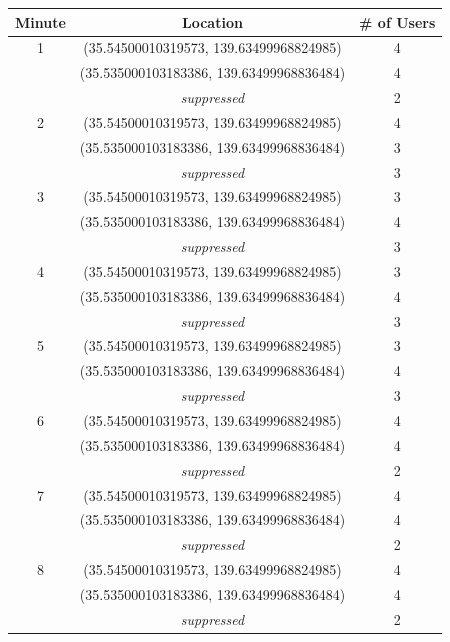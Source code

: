 \begin{table}[htbp]
    \centering
    \begin{tabular}{|c|c|c|} 
        \hline
        \textbf{Minute} & \textbf{Location} & \textbf{\# of Users}\\ [0.5ex] 
        \hline
        1 & (35.54500010319573, 139.63499968824985) & 4 \\ 
        & (35.535000103183386, 139.63499968836484) & 4 \\ 
        &\textit{suppressed} & 2 \\ 
        \hline
        2 & (35.54500010319573, 139.63499968824985) & 4 \\ 
        & (35.535000103183386, 139.63499968836484) & 3 \\ 
        &\textit{suppressed} & 3 \\ 
        \hline
        3 & (35.54500010319573, 139.63499968824985) & 3 \\ 
        & (35.535000103183386, 139.63499968836484) & 4 \\ 
        &\textit{suppressed} & 3 \\ 
        \hline
        4 & (35.54500010319573, 139.63499968824985) & 3 \\ 
        & (35.535000103183386, 139.63499968836484) & 4 \\ 
        &\textit{suppressed} & 3 \\ 
        \hline
        5 & (35.54500010319573, 139.63499968824985) & 3 \\ 
        & (35.535000103183386, 139.63499968836484) & 4 \\ 
        &\textit{suppressed} & 3 \\ 
        \hline
        6 & (35.54500010319573, 139.63499968824985) & 4 \\ 
        & (35.535000103183386, 139.63499968836484) & 4 \\ 
        &\textit{suppressed} & 2 \\ 
        \hline
        7 & (35.54500010319573, 139.63499968824985) & 4 \\ 
        & (35.535000103183386, 139.63499968836484) & 4 \\ 
        &\textit{suppressed} & 2 \\ 
        \hline
        8 & (35.54500010319573, 139.63499968824985) & 4 \\ 
        & (35.535000103183386, 139.63499968836484) & 4 \\ 
        &\textit{suppressed} & 2 \\  

\end{tabular}
\end{table}
